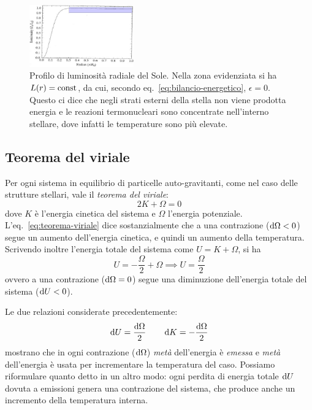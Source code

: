 \begin{figure}
\centering
\includegraphics[width=0.4\textwidth]{immagini/profilo-luminosita-radiale-sole.jpg}
\caption{Profilo di luminosità radiale del Sole. Nella zona evidenziata si ha $L(r) = \textup{const}$, da cui, secondo eq.~\eqref{eq:bilancio-energetico}, $\epsilon = 0$. Questo ci dice che negli strati esterni della stella non viene prodotta energia e le reazioni termonucleari sono concentrate nell'interno stellare, dove infatti le temperature sono più elevate.}
\label{fig:profilo-luminosità-sole}
\end{figure}

\subsection{Teorema del viriale}
Per ogni sistema in equilibrio di particelle auto-gravitanti, come nel caso delle strutture stellari, vale il \emph{teorema del viriale}:
\begin{equation}\label{eq:teorema-viriale}
    2K + \Omega = 0
\end{equation}
dove $K$ è l'energia cinetica del sistema e $\Omega$ l'energia potenziale. L'eq.~\eqref{eq:teorema-viriale} dice sostanzialmente che a una contrazione ($\mathop{\mathrm{{}d}}\mathopen{} \Omega < 0$) segue un aumento dell'energia cinetica, e quindi un aumento della temperatura. Scrivendo inoltre l'energia totale del sistema come $U = K + \Omega$, si ha
\[
U = - \frac{\Omega}{2} + \Omega \implies U = \frac{\Omega}{2}
\]
ovvero a una contrazione ($\mathop{\mathrm{{}d}}\mathopen{} \Omega = 0$) segue una diminuzione dell'energia totale del sistema ($\mathop{\mathrm{{}d}}\mathopen{} U < 0$).

Le due relazioni considerate precedentemente:
\begin{equation}\label{eq:viriale-differenziale}
\mathop{\mathrm{{}d}}\mathopen{} U = \frac{\mathop{\mathrm{{}d}}\mathopen{} \Omega}{2} \qquad \mathop{\mathrm{{}d}}\mathopen{} K = - \frac{\mathop{\mathrm{{}d}}\mathopen{} \Omega}{2}
\end{equation}
mostrano che in ogni contrazione ($\mathop{\mathrm{{}d}}\mathopen{} \Omega$) \emph{metà} dell'energia è \emph{emessa} e \emph{metà} dell'energia è usata per incrementare la temperatura del caso. Possiamo riformulare quanto detto in un altro modo: ogni perdita di energia totale $\mathop{\mathrm{{}d}}\mathopen{} U$ dovuta a emissioni genera una contrazione del sistema, che produce anche un incremento della temperatura interna.

